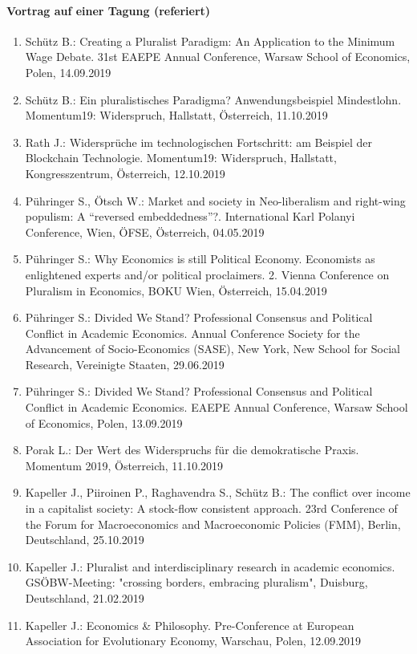 \paragraph{Vortrag auf einer Tagung (referiert)}
\begin{enumerate}
	\item Schütz B.: Creating a Pluralist Paradigm: An Application to the Minimum Wage Debate. 31st EAEPE Annual Conference, Warsaw School of Economics, Polen, 14.09.2019
	\item Schütz B.: Ein pluralistisches Paradigma? Anwendungsbeispiel Mindestlohn. Momentum19: Widerspruch, Hallstatt, Österreich, 11.10.2019
	\item Rath J.: Widersprüche im technologischen Fortschritt: am Beispiel der Blockchain Technologie. Momentum19: Widerspruch, Hallstatt, Kongresszentrum, Österreich, 12.10.2019
	\item Pühringer S., Ötsch W.: Market and society in Neo-liberalism and right-wing populism: A “reversed embeddedness”?. International Karl Polanyi Conference, Wien, ÖFSE, Österreich, 04.05.2019
	\item Pühringer S.: Why Economics is still Political Economy. Economists as enlightened experts and/or political proclaimers. 2. Vienna Conference on Pluralism in Economics, BOKU Wien, Österreich, 15.04.2019
	\item Pühringer S.: Divided We Stand? Professional Consensus and Political Conflict in Academic Economics. Annual Conference Society for the Advancement of Socio-Economics (SASE), New York, New School for Social Research, Vereinigte Staaten, 29.06.2019
	\item Pühringer S.: Divided We Stand? Professional Consensus and Political Conflict in Academic Economics. EAEPE Annual Conference, Warsaw School of Economics, Polen, 13.09.2019
	\item Porak L.: Der Wert des Widerspruchs für die demokratische Praxis. Momentum 2019, Österreich, 11.10.2019
	\item Kapeller J., Piiroinen P., Raghavendra S., Schütz B.: The conflict over income in a capitalist society: A stock-flow consistent approach. 23rd Conference of the Forum for Macroeconomics and Macroeconomic Policies (FMM), Berlin, Deutschland, 25.10.2019
	\item Kapeller J.: Pluralist and interdisciplinary research in academic economics. GSÖBW-Meeting: "crossing borders, embracing pluralism", Duisburg, Deutschland, 21.02.2019
	\item Kapeller J.: Economics & Philosophy. Pre-Conference at European Association for Evolutionary Economy, Warschau, Polen, 12.09.2019

\end{enumerate}
